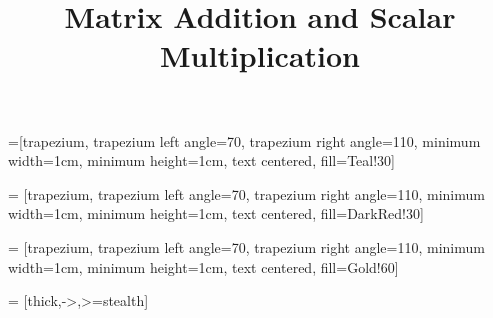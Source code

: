 \title{Matrix Addition and Scalar Multiplication}
\subtitle{\SubTitleName}
\institute[]{\Course}
\author{\Instructor}
\maketitle   


 =[trapezium, trapezium left angle=70, trapezium right angle=110, minimum width=1cm, minimum height=1cm, text centered, fill=Teal!30]

 = [trapezium, trapezium left angle=70, trapezium right angle=110, minimum width=1cm, minimum height=1cm, text centered, fill=DarkRed!30]

 = [trapezium, trapezium left angle=70, trapezium right angle=110, minimum width=1cm, minimum height=1cm, text centered, fill=Gold!60]

 = [thick,->,>=stealth]




